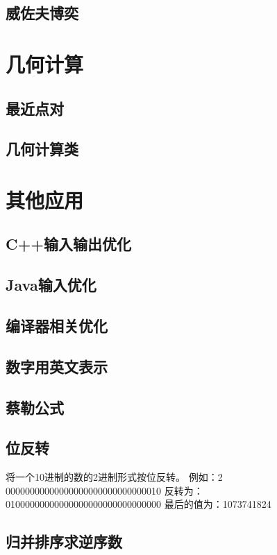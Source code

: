 \documentclass[a4paper, 12pt]{article}
\begin{document}
\subsection{威佐夫博奕}


\section{几何计算}
\subsection{最近点对}

\subsection{几何计算类}


\section{其他应用}
\subsection{C++输入输出优化}

\subsection{Java输入优化}

\subsection{编译器相关优化}

\subsection{数字用英文表示}

\subsection{蔡勒公式}

\subsection{位反转}
将一个10进制的数的2进制形式按位反转。
例如：2
00000000000000000000000000000010
反转为：
01000000000000000000000000000000
最后的值为：1073741824

\subsection{归并排序求逆序数}


\clearpage
\end{document}
